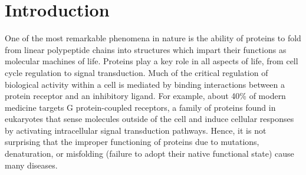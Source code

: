 \chapter{Introduction}



One of the most remarkable phenomena in nature is the ability of proteins to fold from linear polypeptide chains into structures which impart their functions as molecular machines of life. \cite{Dill:2008et,Lappano:2011ve} Proteins play a key role in all aspects of life, from cell cycle regulation\cite{Klionsky:2000ty,Hetts:1998tr} to signal transduction.\cite{Birnbaumer:1990ux}
Much of the critical regulation of biological activity within a cell is mediated by binding interactions between a protein receptor and an inhibitory ligand.\cite{Overington:2006ub} For example, about 40\% of modern medicine targets G protein-coupled receptors,\cite{Overington:2006ub} a family of proteins found in eukaryotes that sense molecules outside of the cell and induce cellular responses by activating intracellular signal transduction pathways.\cite{Kroeze:2003ub} Hence, it is not surprising that the improper functioning of proteins due to mutations, denaturation, or misfolding (failure to adopt their native functional state) cause many diseases.\cite{Hanahan:2000wo,Lappano:2011ve}


